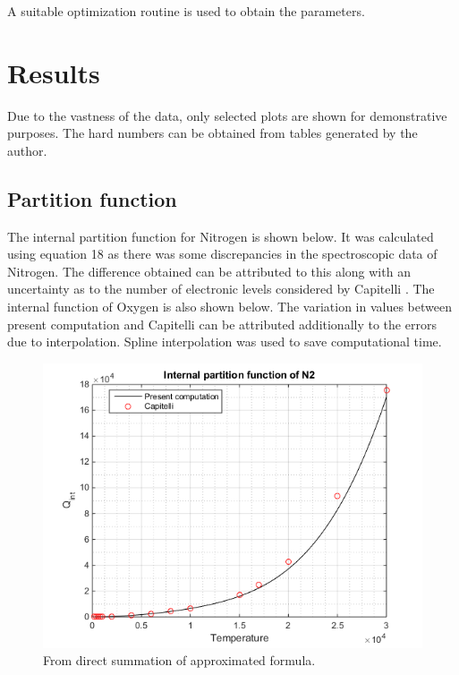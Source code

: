 \documentclass[]{aelab_aiaa-tc}%
\begin{document}
A suitable optimization routine is used to obtain the parameters.


\section{Results}

Due to the vastness of the data, only selected plots are shown for demonstrative purposes. The hard numbers can be obtained from tables generated by the author. 

\subsection{Partition function}

The internal partition function for Nitrogen is shown below. It was calculated using equation 18 as there was some  discrepancies in the spectroscopic data of Nitrogen. The difference obtained can be attributed to this along with an uncertainty as to the number of electronic levels considered by Capitelli \cite{Capitelli:1}. The internal function of Oxygen is also shown below. The variation in values between present computation and Capitelli can be attributed additionally to the errors due to interpolation. Spline interpolation was used to save computational time.

 
\begin{figure}[H!]%
	\includegraphics{QN2fig}
	\caption{From direct summation of approximated formula.}
\end{figure}
\end{document}
